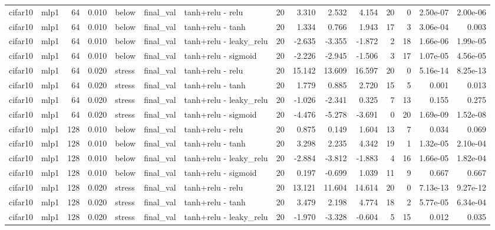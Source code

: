 \begin{table}[htbp]
{\begin{tabular}{@{}llrrlllrrrrrrrr@{}}
cifar10 & mlp1 & 64 & 0.010 & below & final\_val & tanh+relu - relu & 20 & 3.310 & 2.532 & 4.154 & 20 & 0 & 2.50e-07 & 2.00e-06 \\
cifar10 & mlp1 & 64 & 0.010 & below & final\_val & tanh+relu - tanh & 20 & 1.334 & 0.766 & 1.943 & 17 & 3 & 3.06e-04 & 0.003 \\
cifar10 & mlp1 & 64 & 0.010 & below & final\_val & tanh+relu - leaky\_relu & 20 & -2.635 & -3.355 & -1.872 & 2 & 18 & 1.66e-06 & 1.99e-05 \\
cifar10 & mlp1 & 64 & 0.010 & below & final\_val & tanh+relu - sigmoid & 20 & -2.226 & -2.945 & -1.506 & 3 & 17 & 1.07e-05 & 4.56e-05 \\
cifar10 & mlp1 & 64 & 0.020 & stress & final\_val & tanh+relu - relu & 20 & 15.142 & 13.609 & 16.597 & 20 & 0 & 5.16e-14 & 8.25e-13 \\
cifar10 & mlp1 & 64 & 0.020 & stress & final\_val & tanh+relu - tanh & 20 & 1.779 & 0.885 & 2.720 & 15 & 5 & 0.001 & 0.013 \\
cifar10 & mlp1 & 64 & 0.020 & stress & final\_val & tanh+relu - leaky\_relu & 20 & -1.026 & -2.341 & 0.325 & 7 & 13 & 0.155 & 0.275 \\
cifar10 & mlp1 & 64 & 0.020 & stress & final\_val & tanh+relu - sigmoid & 20 & -4.476 & -5.278 & -3.691 & 0 & 20 & 1.69e-09 & 1.52e-08 \\
cifar10 & mlp1 & 128 & 0.010 & below & final\_val & tanh+relu - relu & 20 & 0.875 & 0.149 & 1.604 & 13 & 7 & 0.034 & 0.069 \\
cifar10 & mlp1 & 128 & 0.010 & below & final\_val & tanh+relu - tanh & 20 & 3.298 & 2.235 & 4.342 & 19 & 1 & 1.32e-05 & 2.10e-04 \\
cifar10 & mlp1 & 128 & 0.010 & below & final\_val & tanh+relu - leaky\_relu & 20 & -2.884 & -3.812 & -1.883 & 4 & 16 & 1.66e-05 & 1.82e-04 \\
cifar10 & mlp1 & 128 & 0.010 & below & final\_val & tanh+relu - sigmoid & 20 & 0.197 & -0.699 & 1.039 & 11 & 9 & 0.667 & 0.667 \\
cifar10 & mlp1 & 128 & 0.020 & stress & final\_val & tanh+relu - relu & 20 & 13.121 & 11.604 & 14.614 & 20 & 0 & 7.13e-13 & 9.27e-12 \\
cifar10 & mlp1 & 128 & 0.020 & stress & final\_val & tanh+relu - tanh & 20 & 3.479 & 2.198 & 4.774 & 18 & 2 & 5.77e-05 & 6.34e-04 \\
cifar10 & mlp1 & 128 & 0.020 & stress & final\_val & tanh+relu - leaky\_relu & 20 & -1.970 & -3.328 & -0.604 & 5 & 15 & 0.012 & 0.035 \\

\end{tabular}}
\end{table}
